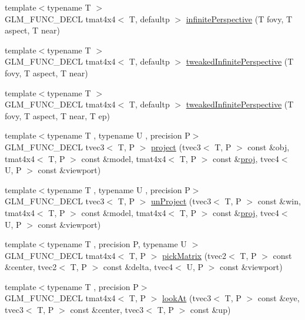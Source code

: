 \begin{DoxyCompactItemize}
\item 
{\footnotesize template$<$typename T $>$ }\\G\+L\+M\+\_\+\+F\+U\+N\+C\+\_\+\+D\+E\+C\+L tmat4x4$<$ T, defaultp $>$ \hyperlink{group__gtc__matrix__transform_ga79f704ad91a5f0d68abd88c66c8186e5}{infinite\+Perspective} (T fovy, T aspect, T near)
\item 
{\footnotesize template$<$typename T $>$ }\\G\+L\+M\+\_\+\+F\+U\+N\+C\+\_\+\+D\+E\+C\+L tmat4x4$<$ T, defaultp $>$ \hyperlink{group__gtc__matrix__transform_gaed64bd81f5ecdab52fecbdf7f6b58194}{tweaked\+Infinite\+Perspective} (T fovy, T aspect, T near)
\item 
{\footnotesize template$<$typename T $>$ }\\G\+L\+M\+\_\+\+F\+U\+N\+C\+\_\+\+D\+E\+C\+L tmat4x4$<$ T, defaultp $>$ \hyperlink{group__gtc__matrix__transform_gaa50fce7f50b5d5da881ed30f5532a921}{tweaked\+Infinite\+Perspective} (T fovy, T aspect, T near, T ep)
\item 
{\footnotesize template$<$typename T , typename U , precision P$>$ }\\G\+L\+M\+\_\+\+F\+U\+N\+C\+\_\+\+D\+E\+C\+L tvec3$<$ T, P $>$ \hyperlink{group__gtc__matrix__transform_gad743556abd138264d4f06f4ca27f1d7e}{project} (tvec3$<$ T, P $>$ const \&obj, tmat4x4$<$ T, P $>$ const \&model, tmat4x4$<$ T, P $>$ const \&\hyperlink{group__gtx__projection_gadf29123bcf748fc9d6fb0998192184cf}{proj}, tvec4$<$ U, P $>$ const \&viewport)
\item 
{\footnotesize template$<$typename T , typename U , precision P$>$ }\\G\+L\+M\+\_\+\+F\+U\+N\+C\+\_\+\+D\+E\+C\+L tvec3$<$ T, P $>$ \hyperlink{group__gtc__matrix__transform_ga82a558de3ce42cbeed0f6ec292a4e1b3}{un\+Project} (tvec3$<$ T, P $>$ const \&win, tmat4x4$<$ T, P $>$ const \&model, tmat4x4$<$ T, P $>$ const \&\hyperlink{group__gtx__projection_gadf29123bcf748fc9d6fb0998192184cf}{proj}, tvec4$<$ U, P $>$ const \&viewport)
\item 
{\footnotesize template$<$typename T , precision P, typename U $>$ }\\G\+L\+M\+\_\+\+F\+U\+N\+C\+\_\+\+D\+E\+C\+L tmat4x4$<$ T, P $>$ \hyperlink{group__gtc__matrix__transform_ga9026c77505b99990f68826f27c267dc5}{pick\+Matrix} (tvec2$<$ T, P $>$ const \&center, tvec2$<$ T, P $>$ const \&delta, tvec4$<$ U, P $>$ const \&viewport)
\item 
{\footnotesize template$<$typename T , precision P$>$ }\\G\+L\+M\+\_\+\+F\+U\+N\+C\+\_\+\+D\+E\+C\+L tmat4x4$<$ T, P $>$ \hyperlink{group__gtc__matrix__transform_gaf8eef81da1ad09f6a8920101c01eaae4}{look\+At} (tvec3$<$ T, P $>$ const \&eye, tvec3$<$ T, P $>$ const \&center, tvec3$<$ T, P $>$ const \&up)

\end{DoxyCompactItemize}
